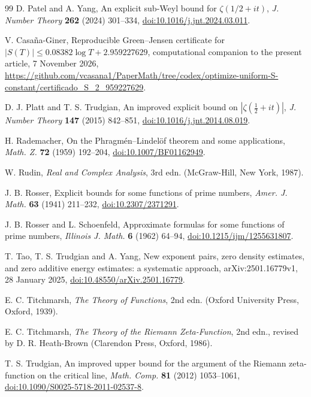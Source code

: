\documentclass[11pt,reqno]{amsart}
\numberwithin{equation}{section}
\theoremstyle{definition}
\theoremstyle{remark}
\begin{document}
\begin{thebibliography}{99}
 D. Patel and A. Yang, An explicit sub-Weyl bound for $\zeta(1/2+it)$, \textit{J. Number Theory} \textbf{262} (2024) 301--334, \href{https://doi.org/10.1016/j.jnt.2024.03.011}{doi:10.1016/j.jnt.2024.03.011}.

 V. Casa\~na-Giner, Reproducible Green--Jensen certificate for $|S(T)|\le0.08382\log T+2.959227629$, computational companion to the present article, 7 November 2026, \url{https://github.com/vcasana1/PaperMath/tree/codex/optimize-uniform-S-constant/certificado_S_2_959227629}.

 D. J. Platt and T. S. Trudgian, An improved explicit bound on $|\zeta(\frac12+it)|$, \textit{J. Number Theory} \textbf{147} (2015) 842--851, \href{https://doi.org/10.1016/j.jnt.2014.08.019}{doi:10.1016/j.jnt.2014.08.019}.

 H. Rademacher, On the Phragm\'en--Lindel\"of theorem and some applications, \textit{Math. Z.} \textbf{72} (1959) 192--204, \href{https://doi.org/10.1007/BF01162949}{doi:10.1007/BF01162949}.

 W. Rudin, \textit{Real and Complex Analysis}, 3rd edn. (McGraw-Hill, New York, 1987).

 J. B. Rosser, Explicit bounds for some functions of prime numbers, \textit{Amer. J. Math.} \textbf{63} (1941) 211--232, \href{https://doi.org/10.2307/2371291}{doi:10.2307/2371291}.

 J. B. Rosser and L. Schoenfeld, Approximate formulas for some functions of prime numbers, \textit{Illinois J. Math.} \textbf{6} (1962) 64--94, \href{https://doi.org/10.1215/ijm/1255631807}{doi:10.1215/ijm/1255631807}.

 T. Tao, T. S. Trudgian and A. Yang, New exponent pairs, zero density estimates, and zero additive energy estimates: a systematic approach, arXiv:2501.16779v1, 28 January 2025, \href{https://doi.org/10.48550/arXiv.2501.16779}{doi:10.48550/arXiv.2501.16779}.

 E. C. Titchmarsh, \textit{The Theory of Functions}, 2nd edn. (Oxford University Press, Oxford, 1939).

 E. C. Titchmarsh, \textit{The Theory of the Riemann Zeta-Function}, 2nd edn., revised by D. R. Heath-Brown (Clarendon Press, Oxford, 1986).

 T. S. Trudgian, An improved upper bound for the argument of the Riemann zeta-function on the critical line, \textit{Math. Comp.} \textbf{81} (2012) 1053--1061, \href{https://doi.org/10.1090/S0025-5718-2011-02537-8}{doi:10.1090/S0025-5718-2011-02537-8}.


\end{thebibliography}
\end{document}
